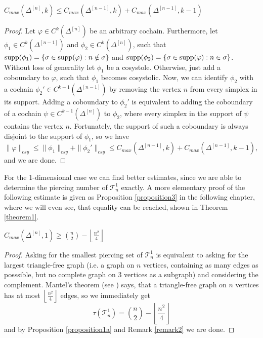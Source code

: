 \begin{prop}\label{proposition232}
\(C_{max}(\Delta^{[n]},k)\leq C_{max}(\Delta^{[n-1]},k)+C_{max}(\Delta^{[n-1]},k-1)\)
\begin{proof}
Let \(\varphi\in C^k(\Delta^{[n]})\) be an arbitrary cochain. Furthermore, let \(\phi_1\in C^k(\Delta^{[n-1]})\) and \(\phi_2\in C^k(\Delta^{[n]})\), such that \(\mathrm{supp}(\phi_1)=\{\sigma\in\mathrm{supp}(\varphi):n\notin\sigma\}\) and \(\mathrm{supp}(\phi_2)=\{\sigma\in\mathrm{supp}(\varphi):n\in\sigma\}\). Without loss of generality let \(\phi_1\) be a cosystole. Otherwise, just add a coboundary to \(\varphi\), such that \(\phi_1\) becomes cosystolic. Now, we can identify \(\phi_2\) with a cochain \(\phi_2'\in C^{k-1}(\Delta^{[n-1]})\) by removing the vertex \(n\) from every simplex in its support. Adding a coboundary to \(\phi_2'\) is equivalent to adding the coboundary of a cochain \(\psi\in C^{k-1}(\Delta^{[n]})\) to \(\phi_2\), where every simplex in the support of \(\psi\) contains the vertex \(n\). Fortunately, the support of such a coboundary is always disjoint to the support of \(\phi_1\), so we have
\[
\|\varphi\|_{csy}\leq\|\phi_1\|_{csy}+\|\phi_2'\|_{csy}\leq C_{max}(\Delta^{[n-1]},k)+C_{max}(\Delta^{[n-1]},k-1),
\]
and we are done.
\end{proof}
\end{prop}

For the \(1\)-dimensional case we can find better estimates, since we are able to determine the piercing number of \(\mathcal{T}_n^1\) exactly. A more elementary proof of the following estimate is given as Proposition \ref{proposition3} in the following chapter, where we will even see, that equality can be reached, shown in Theorem \ref{theorem1}.

\begin{prop}\label{proposition112}
\(C_{max}(\Delta^{[n]},1)\geq\binom{n}{2}-\left\lfloor\frac{n^2}{4}\right\rfloor\)
\begin{proof}
Asking for the smallest piercing set of \(\mathcal{T}_n^1\) is equivalent to asking for the largest triangle-free graph (i.e. a graph on \(n\) vertices, containing as many edges as posssible, but no complete graph on \(3\) vertices as a subgraph) and considering the complement. Mantel's theorem (see \cite{7}) says, that a triangle-free graph on \(n\) vertices has at most \(\left\lfloor\frac{n^2}{4}\right\rfloor\) edges, so we immediately get
\[
\tau(\mathcal{T}_n^1)=\binom{n}{2}-\left\lfloor\frac{n^2}{4}\right\rfloor
\]
and by Proposition \ref{proposition1a} and Remark \ref{remark2} we are done.
\end{proof}
\end{prop}

